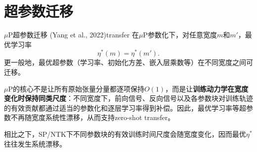 \documentclass[11pt,a4paper]{article}
\begin{document}
\section{超参数迁移}

\begin{theorem}{$\mu$P超参数迁移 (Yang et al., 2022)}{transfer}
在$\mu$P参数化下，对任意宽度$m$和$m'$，最优学习率
\[
\eta^*(m) = \eta^*(m').
\]
更一般地，最优超参数（学习率、初始化方差、嵌入层乘数等）在不同宽度之间可迁移。
\end{theorem}

\begin{keyinsight}[——为什么迁移成立]
$\mu$P的核心不是让所有原始张量分量都逐项保持$O(1)$，而是让\textbf{训练动力学在宽度变化时保持同类尺度}：不同宽度下，前向信号、反向信号以及各参数块对训练轨迹的有效贡献都通过适当的参数化和逐层学习率得到补偿。因此，最优学习率等超参数不再随宽度系统性漂移，从而支持zero-shot transfer。

相比之下，SP/NTK下不同参数块的有效训练时间尺度会随宽度变化，因而最优$\eta^*$往往发生系统漂移。
\end{keyinsight}
\end{document}
